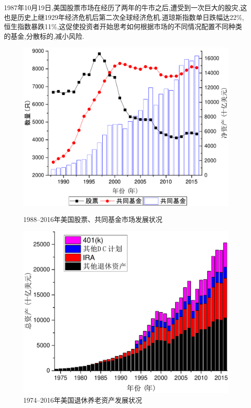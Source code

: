 \documentclass[10.5pt,onecolumn,a4paper]{article}%
\begin{document}
1987年10月19日,美国股票市场在经历了两年的牛市之后,遭受到一次巨大的股灾,这也是历史上继1929年经济危机后第二次全球经济危机.道琼斯指数单日跌幅达22\%,恒生指数暴跌11\%,这促使投资者开始思考如何根据市场的不同情况配置不同种类的基金,分散标的,减小风险.

\begin{figure}[ht]
\begin{minipage}[ht]{0.47\textwidth}
\centering
\includegraphics[width=\textwidth]{pic/mutual.pdf}
\caption{1988--2016年美国股票、共同基金市场发展状况}\label{fg:mutual}
\end{minipage}%
\hspace{0.06\textwidth}
\begin{minipage}[ht]{0.47\textwidth}
\centering
\includegraphics[width=\textwidth]{pic/retirement.pdf}
\caption{1974--2016年美国退休养老资产发展状况}\label{fg:retirement}
\end{minipage}
\end{figure}
\end{document}
